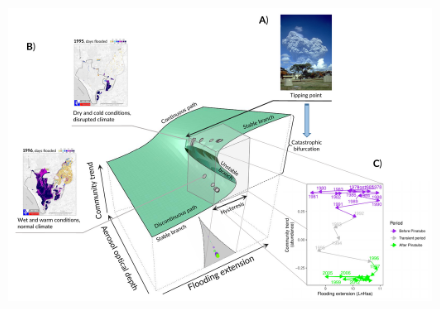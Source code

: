 \documentclass[12pt]{article}
\begin{document}
	\begin{figure}[t]
		\centering
		\includegraphics[width=\linewidth]{processed_figs/Cusp_diagram}

\end{figure}
\end{document}
